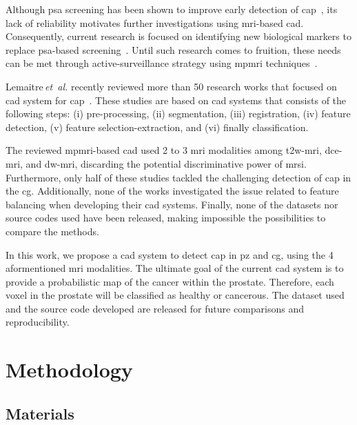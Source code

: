 \documentclass[conference]{sty/ieeeconf}
\begin{document}
Although \ac{psa} screening has been shown to improve early detection
of \ac{cap}~\cite{Chou2011}, its lack of reliability motivates further
investigations using \ac{mri}-based \ac{cad}.
Consequently, current research is focused on identifying new
biological markers to replace \ac{psa}-based
screening~\cite{Brenner2013}.
Until such research comes to fruition, these needs can be met through
active-surveillance strategy using \ac{mpmri}
techniques~\cite{Moore2013}.

Lemaitre\,\emph{et~al.} recently reviewed
more than 50 research works that focused on \ac{cad} system for
\ac{cap}~\cite{Lemaitre2015}.
These studies are based on \ac{cad} systems that consists of the
following steps:
(i) pre-processing,
(ii) segmentation,
(iii) registration,
(iv) feature detection,
(v) feature selection-extraction, and
(vi) finally classification.

The reviewed \ac{mpmri}-based \ac{cad} used 2 to 3
\ac{mri} modalities among \ac{t2w}-\ac{mri}, \ac{dce}-\ac{mri}, and
\ac{dw}-\ac{mri}, discarding the potential discriminative power of
\ac{mrsi}.
Furthermore, only half of these studies tackled the challenging
detection of \ac{cap} in the \ac{cg}.
Additionally, none of the works investigated the issue related to
feature balancing when developing their \ac{cad} systems.
Finally, none of the datasets nor source codes used have been
released, making impossible the possibilities to compare the methods.

In this work, we propose a \ac{cad} system to detect \ac{cap} in
\ac{pz} and \ac{cg}, using the 4 aformentioned \ac{mri}
modalities.
The ultimate goal of the current \ac{cad} system is to provide a probabilistic
map of the cancer within the prostate.
Therefore, each voxel in the prostate will be classified as healthy or
cancerous.
The dataset used and the source code developed are released for future
comparisons and reproducibility.

\section{Methodology}\label{sec:chp6:method}

\subsection{Materials}
\end{document}
